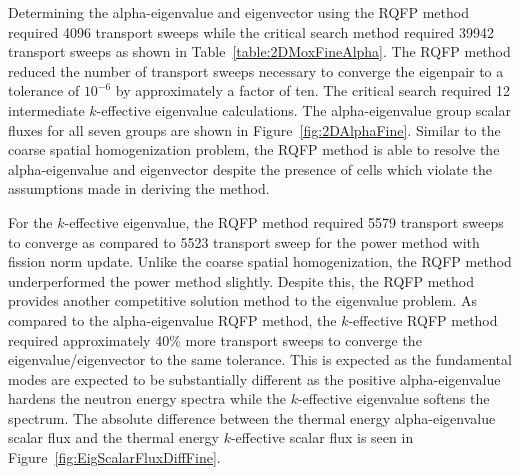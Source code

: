 \clearpage

Determining the alpha-eigenvalue and eigenvector using the RQFP method required 4096 transport sweeps while the critical search method required 39942 transport sweeps as shown in Table~\ref{table:2DMoxFineAlpha}. The RQFP method reduced the number of transport sweeps necessary to converge the eigenpair to a tolerance of $10^{-6}$ by approximately a factor of ten. The critical search required 12 intermediate $k$-effective eigenvalue calculations. The alpha-eigenvalue group scalar fluxes for all seven groups are shown in Figure~\ref{fig:2DAlphaFine}. Similar to the coarse spatial homogenization problem, the RQFP method is able to resolve the alpha-eigenvalue and eigenvector despite the presence of cells which violate the assumptions made in deriving the method.

For the $k$-effective eigenvalue, the RQFP method required 5579 transport sweeps to converge as compared to 5523 transport sweep for the power method with fission norm update. Unlike the coarse spatial homogenization, the RQFP method underperformed the power method slightly. Despite this, the RQFP method provides another competitive solution method to the eigenvalue problem. As compared to the alpha-eigenvalue RQFP method, the $k$-effective RQFP method required approximately 40\% more transport sweeps to converge the eigenvalue/eigenvector to the same tolerance. This is expected as the fundamental modes are expected to be substantially different as the positive alpha-eigenvalue hardens the neutron energy spectra while the $k$-effective eigenvalue softens the spectrum. The absolute difference between the thermal energy alpha-eigenvalue scalar flux and the thermal energy $k$-effective scalar flux is seen in Figure~\ref{fig:EigScalarFluxDiffFine}.

